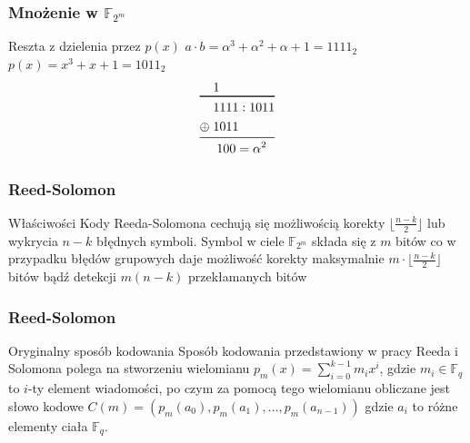 \documentclass{beamer}
\begin{document}
\begin{frame}
	\frametitle{Mnożenie w $\mathbb{F}_{2^m}$}
	\begin{exampleblock}{Reszta z dzielenia przez $p(x)$}
		$a \cdot b = \alpha^3 + \alpha^2 + \alpha + 1 = 1111_2$
		\newline
		$p(x) = x^3 + x + 1 = 1011_2$
		\begin{equation*}
			\begin{split}
				          &1 \\
						  \toprule
				          &1111 : 1011 \\
				\oplus \; &1011 \\
						  \midrule
						  &\;100 = \alpha^2
			\end{split}
		\end{equation*}
	\end{exampleblock}
\end{frame}

\begin{frame}
	\frametitle{Reed-Solomon}
	\begin{exampleblock}{Właściwości}
		Kody Reeda-Solomona cechują się możliwością korekty $\lfloor \frac{n-k}{2} \rfloor$
		lub wykrycia $n-k$ błędnych symboli. Symbol w ciele $\mathbb{F}_{2^m}$ składa się
		z $m$ bitów co w przypadku błędów grupowych daje możliwość korekty maksymalnie
		$m \cdot \lfloor \frac{n-k}{2} \rfloor$ bitów bądź detekcji $m(n-k)$ przekłamanych
		bitów
	\end{exampleblock}
\end{frame}

\begin{frame}
	\frametitle{Reed-Solomon}
	\begin{exampleblock}{Oryginalny sposób kodowania}
		Sposób kodowania przedstawiony w pracy Reeda i Solomona polega na stworzeniu
		wielomianu $p_m(x)=\sum_{i=0}^{k-1}m_{i}x^i$, gdzie $m_i\in\mathbb{F}_q$ to
		$i$\nobreakdash-ty element wiadomości, po czym za pomocą tego wielomianu
		obliczane jest słowo kodowe $C(m)=(p_m(a_0), p_m(a_1), \ldots, p_m(a_{n-1}))$
		gdzie $a_i$ to różne elementy ciała $\mathbb{F}_q$.
	\end{exampleblock}
\end{frame}
\end{document}
